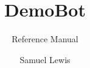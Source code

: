 \documentclass{technical-reference-manual}
\title{DemoBot}
\subtitle{Reference Manual}
\author{Samuel Lewis}
\begin{document}
	
	\graphicspath{ {./assets/} }
	
	\maketitle
	
	\tableofcontents
	\newpage
	
	
	
	
\end{document}
